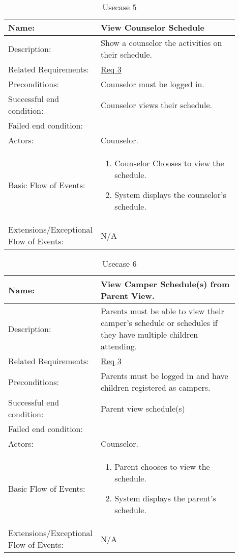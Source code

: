 \documentclass[11pt]{article}
\begin{document}
\begin{table}[!htb]
\caption{Usecase 5}
\label{des:view counselor schedules}
\begin{center}
\begin{tabular}{p{0.30\linewidth}p{0.60\linewidth}}
	Name: & View Counselor Schedule\\\hline
	Description: & Show a counselor the activities on their schedule.\\\hline
	Related Requirements:& \hyperlink{Req3}{Req 3}\\\hline
	Preconditions:& Counselor must be logged in.\\\hline
	Successful end condition:& Counselor views their schedule. \\\hline
	Failed end condition:& \\\hline
	Actors:& Counselor. \\\hline
	Basic Flow of Events: & \begin{enumerate}[topsep=0pt]
		\item Counselor Chooses to view the schedule.
		\item System displays the counselor's schedule.
	\end{enumerate}\\\hline
	Extensions/Exceptional Flow of Events: & \vspace*{.25em}  N/A
\end{tabular}
\end{center}
\end{table}

\begin{table}[!htb]
\caption{Usecase 6}
\label{des:view camper schedules}
\begin{center}
\begin{tabular}{p{0.30\linewidth}p{0.60\linewidth}}
	Name: & View Camper Schedule(s) from Parent View.\\\hline
	Description: & Parents must be able to view their camper's schedule or schedules if they have multiple children attending.\\\hline
	Related Requirements:& \hyperlink{Req3}{Req 3}\\\hline
	Preconditions:& Parents must be logged in and have children registered as campers.\\\hline
	Successful end condition:& Parent view schedule(s) \\\hline
	Failed end condition:& \\\hline
	Actors:& Counselor. \\\hline
	Basic Flow of Events: & \begin{enumerate}[topsep=0pt]
		\item Parent chooses to view the schedule.
		\item System displays the parent's schedule.
	\end{enumerate}\\\hline
	Extensions/Exceptional Flow of Events: & \vspace*{.25em}  N/A
\end{tabular}
\end{center}
\end{table}
\end{document}
